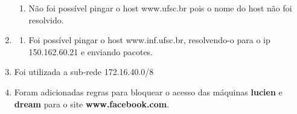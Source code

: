 \documentclass[a4paper, 12pt]{article}
\begin{document}
\begin{enumerate}
\begin{enumerate}
\item Não foi possível pingar o host www.ufsc.br pois o nome do host
  não foi resolvido.

\end{enumerate}

\item 
\begin{enumerate}

\item Foi possível pingar o host www.inf.ufsc.br, resolvendo-o para o
  ip 150.162.60.21 e enviando pacotes.

\end{enumerate}


\item Foi utilizada a sub-rede 172.16.40.0/8

\item Foram adicionadas regras para bloquear o acesso das máquinas
  {\bf lucien} e {\bf dream} para o site {\bf
    www.facebook.com}. 

\end{enumerate}
\end{document}

